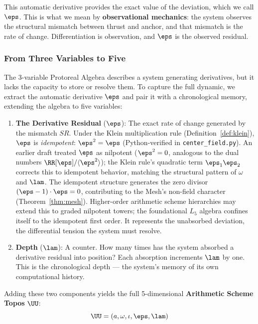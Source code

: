 This automatic derivative provides the exact value of the deviation, which we call $\eps$. This is what we mean by \textbf{observational mechanics}: the system observes the structural mismatch between thrust and anchor, and that mismatch is the rate of change. Differentiation is observation, and $\eps$ is the observed residual.

\subsubsection*{From Three Variables to Five}

The 3-variable Protoreal Algebra describes a system generating derivatives, but it lacks the capacity to store or resolve them. To capture the full dynamic, we extract the automatic derivative $\eps$ and pair it with a chronological memory, extending the algebra to five variables:

\begin{enumerate}
\item \textbf{The Derivative Residual} ($\eps$): The exact rate of change generated by the mismatch $SR$. Under the Klein multiplication rule (Definition~\ref{def:klein}), $\eps$ is \emph{idempotent}: $\eps^2 = \eps$ (Python-verified in \texttt{center\_field.py}). An earlier draft treated $\eps$ as nilpotent ($\eps^2 = 0$, analogous to the dual numbers $\RR[\eps]/\langle\eps^2\rangle$); the Klein rule's quadratic term $\eps_1 \eps_2$ corrects this to idempotent behavior, matching the structural pattern of $\omega$ and $\lam$. The idempotent structure generates the zero divisor $(\eps - 1)\cdot \eps = 0$, contributing to the Mesh's non-field character (Theorem~\ref{thm:mesh}). Higher-order arithmetic scheme hierarchies may extend this to graded nilpotent towers; the foundational $L_5$ algebra confines itself to the idempotent first order. It represents the unabsorbed deviation, the differential tension the system must resolve.
\item \textbf{Depth} ($\lam$): A counter. How many times has the system absorbed a derivative residual into position? Each absorption increments $\lam$ by one. This is the chronological depth --- the system's memory of its own computational history.
\end{enumerate}

Adding these two components yields the full 5-dimensional \textbf{Arithmetic Scheme Topos} $\UU$:
$$\UU = (a, \omega, \iota, \eps, \lam)$$

